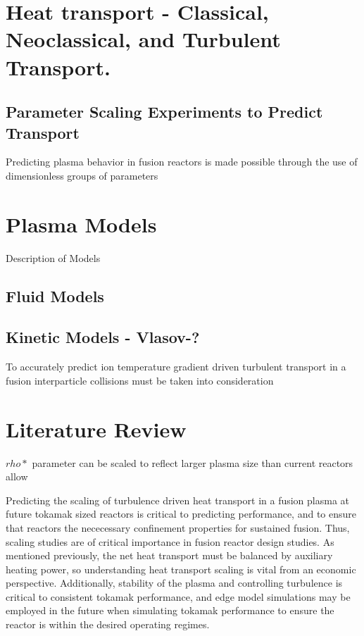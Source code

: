 \documentclass{article}
\begin{document}
%
\section{Heat transport - Classical, Neoclassical, and Turbulent Transport.} 


\subsection{Parameter Scaling Experiments to Predict Transport }
Predicting plasma behavior in fusion reactors is made possible through the use of dimensionless groups of parameters 

\section{Plasma Models}
Description of Models
\subsection{Fluid Models}
\subsection{Kinetic Models - Vlasov-? }
To accurately predict ion temperature gradient driven turbulent transport in a fusion interparticle collisions must be taken into consideration  


\section{Literature Review}
$rho*$ parameter can be scaled to reflect larger plasma size than current reactors allow

Predicting the scaling of turbulence driven heat transport in a fusion plasma at future tokamak sized reactors is critical to predicting performance, and to ensure that reactors the nececessary confinement properties for sustained fusion. Thus, scaling studies are of critical importance in fusion reactor design studies. As mentioned previously, the net heat transport must be balanced by auxiliary heating power, so understanding heat transport scaling is vital from an economic perspective. Additionally, stability of the plasma and controlling turbulence is critical to consistent tokamak performance, and edge model simulations may be employed in the future when simulating tokamak performance to ensure the reactor is within the desired operating regimes. \\
\end{document}
